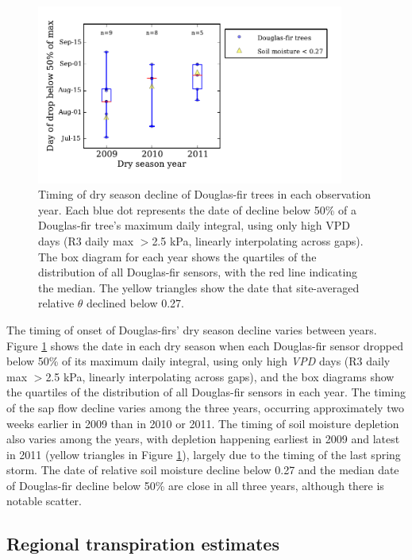 \begin{figure}[here]
\includegraphics[width=0.9\textwidth]{ch1-sapflow/figures/Figure09.pdf}
\caption{Timing of dry season decline of Douglas-fir trees in each observation year. Each blue dot represents the date of decline below 50\% of a Douglas-fir tree's maximum daily integral, using only high VPD days (R3 daily max $>$2.5 kPa, linearly interpolating across gaps). The box diagram for each year shows the quartiles of the distribution of all Douglas-fir sensors, with the red line indicating the median. The yellow triangles show the date that site-averaged relative $\theta$ declined below 0.27.}
\label{fig:sapflow_interannual}
\end{figure}

The timing of onset of Douglas-firs' dry season decline varies between years.  Figure \ref{fig:sapflow_interannual} shows the date in each dry season when each Douglas-fir sensor dropped below 50\% of its maximum daily integral, using only high \textit{VPD} days (R3 daily max $>$2.5 kPa, linearly interpolating across gaps), and the box diagrams show the quartiles of the distribution of all Douglas-fir sensors in each year.  The timing of the sap flow decline varies among the three years, occurring approximately two weeks earlier in 2009 than in 2010 or 2011.  The timing of soil moisture depletion also varies among the years, with depletion happening earliest in 2009 and latest in 2011 (yellow triangles in Figure \ref{fig:sapflow_interannual}), largely due to the timing of the last spring storm.  The date of relative soil moisture decline below 0.27 and the median date of Douglas-fir decline below 50\% are close in all three years, although there is notable scatter.

\subsection{Regional transpiration estimates}

